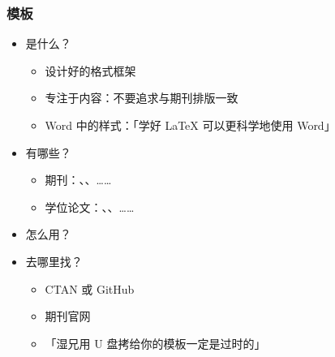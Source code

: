 \begin{frame}[fragile]
\frametitle{模板}
\begin{itemize}
  \item<+-> 是什么？

    \begin{itemize}
      \item 设计好的格式框架
      \item 专注于内容：\alert{不要追求与期刊排版一致}
      \item Word 中的样式：「学好 \LaTeX{} 可以更科学地使用 Word」
    \end{itemize}

  \item<+-> 有哪些？

    \begin{itemize}
      \item 期刊：、、……
      \item 学位论文：、、\alert{}……
    \end{itemize}

  \item<+-> 怎么用？


  \item<+-> 去哪里找？

    \begin{itemize}
      \item CTAN  或 GitHub \href{https://github.com}{\faGithub}
      \item 期刊官网
      \item 「湿兄用 U 盘拷给你的模板一定是过时的」
    \end{itemize}
\end{itemize}
\end{frame}
